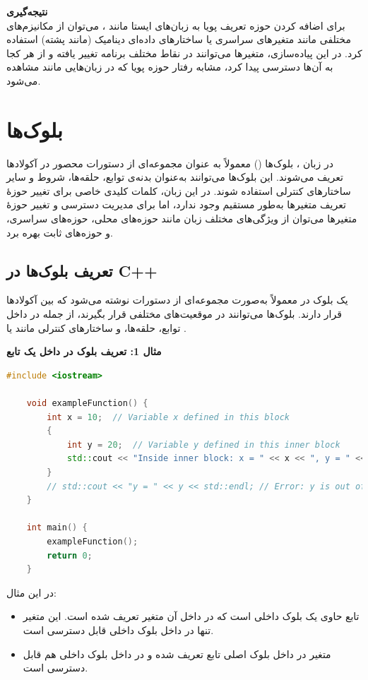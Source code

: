 \documentclass[12pt, a4paper]{report}
\begin{document}
\textbf{نتیجه‌گیری} \\
برای اضافه کردن حوزه تعریف پویا به زبان‌های ایستا مانند ، می‌توان از مکانیزم‌های مختلفی مانند متغیرهای سراسری یا ساختارهای داده‌ای دینامیک (مانند پشته) استفاده کرد. در این پیاده‌سازی، متغیرها می‌توانند در نقاط مختلف برنامه تغییر یافته و از هر کجا به آن‌ها دسترسی پیدا کرد، مشابه رفتار حوزه پویا که در زبان‌هایی مانند  مشاهده می‌شود.

\section{بلوک‌ها}
در زبان ، بلوک‌ها () معمولاً به عنوان مجموعه‌ای از دستورات محصور در آکولادها {} تعریف می‌شوند. این بلوک‌ها می‌توانند به‌عنوان بدنه‌ی توابع، حلقه‌ها، شروط و سایر ساختارهای کنترلی استفاده شوند. در این زبان، کلمات کلیدی خاصی برای تغییر حوزۀ تعریف متغیرها به‌طور مستقیم وجود ندارد، اما برای مدیریت دسترسی و تغییر حوزۀ متغیرها می‌توان از ویژگی‌های مختلف زبان مانند حوزه‌های محلی، حوزه‌های سراسری، و حوزه‌های ثابت بهره برد.

\subsection{تعریف بلوک‌ها در C++}
یک بلوک در  معمولاً به‌صورت مجموعه‌ای از دستورات نوشته می‌شود که بین آکولادها قرار دارند. بلوک‌ها می‌توانند در موقعیت‌های مختلفی قرار بگیرند، از جمله در داخل توابع، حلقه‌ها، و ساختارهای کنترلی مانند  یا .

\textbf{مثال 1: تعریف بلوک در داخل یک تابع}
\LTR
\begin{lstlisting}[language=C++, breaklines=true]
	#include <iostream>
	
	void exampleFunction() {
		int x = 10;  // Variable x defined in this block
		{
			int y = 20;  // Variable y defined in this inner block
			std::cout << "Inside inner block: x = " << x << ", y = " << y << std::endl;
		}
		// std::cout << "y = " << y << std::endl; // Error: y is out of scope
	}
	
	int main() {
		exampleFunction();
		return 0;
	}
\end{lstlisting}
\RTL
در این مثال:
\begin{itemize}
	\item تابع  حاوی یک بلوک داخلی است که در داخل آن متغیر  تعریف شده است. این متغیر تنها در داخل بلوک داخلی قابل دسترسی است.
	\item متغیر  در داخل بلوک اصلی تابع تعریف شده و در داخل بلوک داخلی هم قابل دسترسی است.
\end{itemize}
\end{document}
